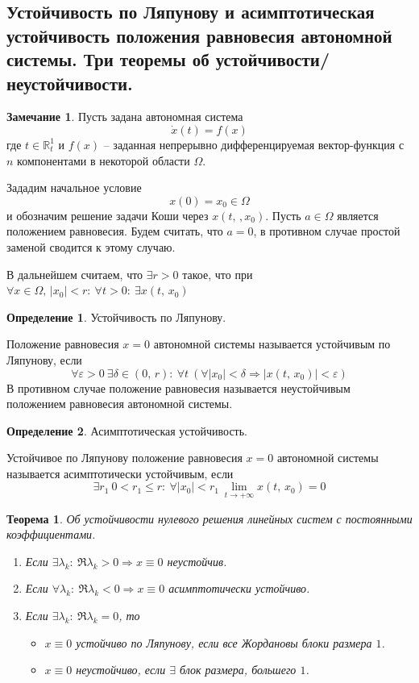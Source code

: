 \documentclass[a4paper,12pt]{article}
\renewcommand{\leq}{\ensuremath{\leqslant}}
\theoremstyle{plain}
\newtheorem{theorem}{Теорема}[section]
\theoremstyle{definition}
\newtheorem{definition}{Определение}[section]
\newtheorem*{note}{Замечание}
\theoremstyle{remark}
\begin{document}
\subsection{Устойчивость по Ляпунову и асимптотическая устойчивость положения равновесия автономной системы. Три теоремы об устойчивости/неустойчивости.}
\begin{note}
	Пусть задана автономная система
	\[\dot{x}(t) = f(x)\]
	где $t \in \mathbb{R}^1_t$ и $f(x)$ -- заданная непрерывно дифференцируемая вектор-функция с $n$ компонентами в некоторой области $\Omega$.

	Зададим начальное условие
	\[x(0) = x_0 \in \Omega\]
	и обозначим решение задачи Коши через $x(t,\,,x_0)$. Пусть $a \in \Omega$ является положением равновесия. Будем считать, что $a  = 0$, в противном случае простой заменой сводится к этому случаю.

	В дальнейшем считаем, что $\exists r > 0$ такое, что при $\forall x \in \Omega,\, |x_0| < r :\: \forall t > 0 :\: \exists x(t,\, x_0)$
\end{note}

\begin{definition}
	Устойчивость по Ляпунову.

	Положение равновесия $x = 0$ автономной системы называется устойчивым по Ляпунову, если
	\[\forall \varepsilon > 0 \: \exists \delta \in (0,\, r) :\: \forall t\:(\forall|x_0| < \delta \Rightarrow |x(t,\, x_0)| < \varepsilon)\]
	В противном случае положение равновесия называется неустойчивым положением равновесия автономной системы.
\end{definition}

\begin{definition}
	Асимптотическая устойчивость.

	Устойчивое по Ляпунову положение равновесия $x = 0$ автономной системы называется асимптотически устойчивым, если
	\[\exists r_1\: 0 < r_1 \leq r:\: \forall |x_0| < r_1 \: \lim_{t \to +\infty} x(t,\, x_0) = 0\]
\end{definition}

\begin{theorem}
	Об устойчивости нулевого решения линейных систем с постоянными коэффициентами.

	\begin{enumerate}
		\item Если $\exists \lambda_k:\: \Re \lambda_k > 0 \Rightarrow x \equiv 0$ неустойчив.
		\item Если $\forall \lambda_k:\: \Re \lambda_k < 0 \Rightarrow x \equiv 0$ асимптотически устойчиво.
		\item Если $\exists \lambda_k:\: \Re \lambda_k = 0$, то
		      \begin{itemize}
			      \item $x \equiv 0$ устойчиво по Ляпунову, если все Жордановы блоки размера $1$.
			      \item $x \equiv 0$ неустойчиво, если $\exists$ блок размера, большего $1$.
		      \end{itemize}
	\end{enumerate}
\end{theorem}
\end{document}
